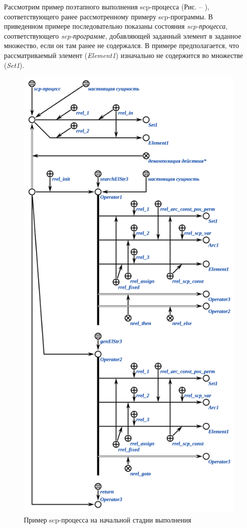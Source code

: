 Рассмотрим пример поэтапного выполнения scp-процесса (Рис. \textit{} -- \textit{}), соответствующего ранее рассмотренному примеру scp-программы. В приведенном примере последовательно показаны состояния \textit{scp-процесса}, соответствующего \textit{\mbox{scp-программе}}, добавляющей заданный элемент в заданное множество, если он там ранее не содержался. В примере предполагается, что рассматриваемый элемент (\textit{Element1}) изначально не содержится во множестве (\textit{Set1}).

\begin{figure}[H]
	\centering
	\includegraphics[scale=0.8]{images/part3/chapter_situation_management/process_example.png}
	\caption{Пример scp-процесса на начальной стадии выполнения}
	\label{fig:process_example}
\end{figure}

